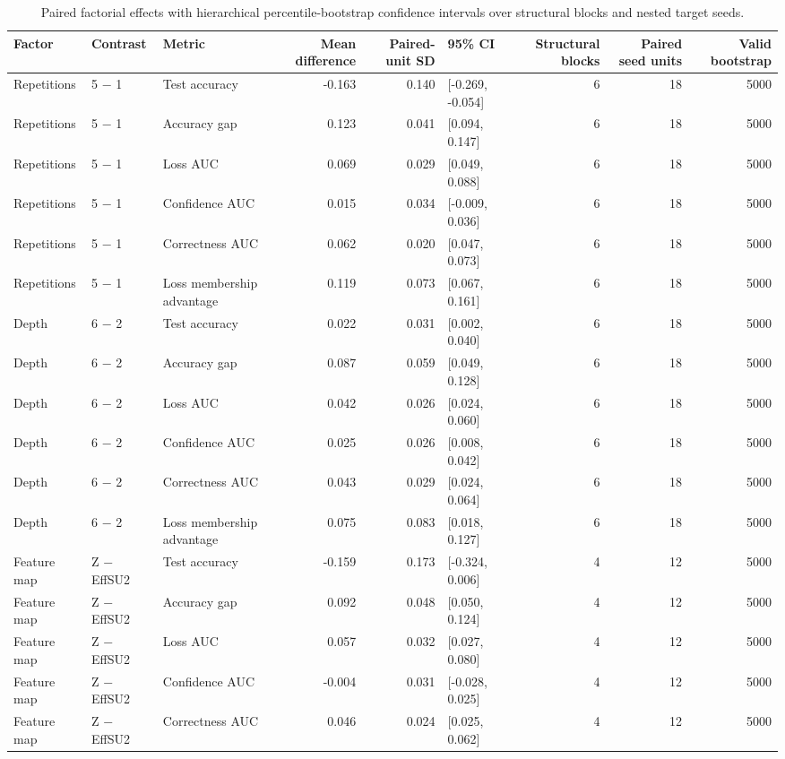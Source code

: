 \begin{table}[t]
\caption{Paired factorial effects with hierarchical percentile-bootstrap confidence intervals over structural blocks and nested target seeds.}
\label{tab:factorial-effects}
\begin{tabular}{lllrrlrrr}
\toprule
Factor & Contrast & Metric & Mean difference & Paired-unit SD & 95\% CI & Structural blocks & Paired seed units & Valid bootstrap \\
\midrule
Repetitions & 5 − 1 & Test accuracy & -0.163 & 0.140 & [-0.269, -0.054] & 6 & 18 & 5000 \\
Repetitions & 5 − 1 & Accuracy gap & 0.123 & 0.041 & [0.094, 0.147] & 6 & 18 & 5000 \\
Repetitions & 5 − 1 & Loss AUC & 0.069 & 0.029 & [0.049, 0.088] & 6 & 18 & 5000 \\
Repetitions & 5 − 1 & Confidence AUC & 0.015 & 0.034 & [-0.009, 0.036] & 6 & 18 & 5000 \\
Repetitions & 5 − 1 & Correctness AUC & 0.062 & 0.020 & [0.047, 0.073] & 6 & 18 & 5000 \\
Repetitions & 5 − 1 & Loss membership advantage & 0.119 & 0.073 & [0.067, 0.161] & 6 & 18 & 5000 \\
Depth & 6 − 2 & Test accuracy & 0.022 & 0.031 & [0.002, 0.040] & 6 & 18 & 5000 \\
Depth & 6 − 2 & Accuracy gap & 0.087 & 0.059 & [0.049, 0.128] & 6 & 18 & 5000 \\
Depth & 6 − 2 & Loss AUC & 0.042 & 0.026 & [0.024, 0.060] & 6 & 18 & 5000 \\
Depth & 6 − 2 & Confidence AUC & 0.025 & 0.026 & [0.008, 0.042] & 6 & 18 & 5000 \\
Depth & 6 − 2 & Correctness AUC & 0.043 & 0.029 & [0.024, 0.064] & 6 & 18 & 5000 \\
Depth & 6 − 2 & Loss membership advantage & 0.075 & 0.083 & [0.018, 0.127] & 6 & 18 & 5000 \\
Feature map & Z − EffSU2 & Test accuracy & -0.159 & 0.173 & [-0.324, 0.006] & 4 & 12 & 5000 \\
Feature map & Z − EffSU2 & Accuracy gap & 0.092 & 0.048 & [0.050, 0.124] & 4 & 12 & 5000 \\
Feature map & Z − EffSU2 & Loss AUC & 0.057 & 0.032 & [0.027, 0.080] & 4 & 12 & 5000 \\
Feature map & Z − EffSU2 & Confidence AUC & -0.004 & 0.031 & [-0.028, 0.025] & 4 & 12 & 5000 \\
Feature map & Z − EffSU2 & Correctness AUC & 0.046 & 0.024 & [0.025, 0.062] & 4 & 12 & 5000 \\

\end{tabular}
\end{table}
